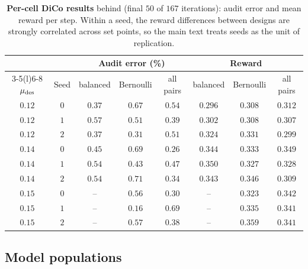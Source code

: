 \begin{table}[ht]
\centering
\small
\caption{\textbf{Per-cell DiCo results} behind  (final $50$ of $167$ iterations):
audit error and mean reward per step. Within a seed, the reward differences between
designs are strongly correlated across set points, so the main text treats seeds as the
unit of replication.}
\label{tab:dico-cells}
\begin{tabular}{@{}cc ccc ccc@{}}
\toprule
& & \multicolumn{3}{c}{Audit error (\%)} & \multicolumn{3}{c}{Reward} \\
\cmidrule(lr){3-5}\cmidrule(l){6-8}
$\mu_{\mathrm{des}}$ & Seed & balanced & Bernoulli & all pairs & balanced & Bernoulli & all pairs \\
\midrule
$0.12$ & $0$ & $0.37$ & $0.67$ & $0.54$ & $0.296$ & $0.308$ & $0.312$ \\
$0.12$ & $1$ & $0.57$ & $0.51$ & $0.39$ & $0.302$ & $0.308$ & $0.307$ \\
$0.12$ & $2$ & $0.37$ & $0.31$ & $0.51$ & $0.324$ & $0.331$ & $0.299$ \\
\addlinespace
$0.14$ & $0$ & $0.45$ & $0.69$ & $0.26$ & $0.344$ & $0.333$ & $0.349$ \\
$0.14$ & $1$ & $0.54$ & $0.43$ & $0.47$ & $0.350$ & $0.327$ & $0.328$ \\
$0.14$ & $2$ & $0.54$ & $0.71$ & $0.34$ & $0.343$ & $0.346$ & $0.309$ \\
\addlinespace
$0.15$ & $0$ & -- & $0.56$ & $0.30$ & -- & $0.323$ & $0.342$ \\
$0.15$ & $1$ & -- & $0.16$ & $0.69$ & -- & $0.335$ & $0.341$ \\
$0.15$ & $2$ & -- & $0.57$ & $0.38$ & -- & $0.359$ & $0.341$ \\
\bottomrule
\end{tabular}
\end{table}


\subsection{Model populations}
\label{app:exp-details:zoo}


